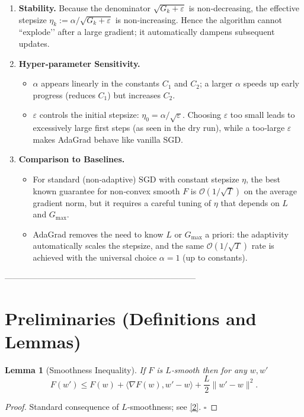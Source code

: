 \documentclass{article}
\newtheorem{lemma}{Lemma}
\begin{document}
\begin{enumerate}[label=\arabic*.]
\item \textbf{Stability.}  Because the denominator $\sqrt{G_k+\varepsilon}$ is non‑decreasing, the effective stepsize $\eta_k:=\alpha/\sqrt{G_k+\varepsilon}$ is non‑increasing.  Hence the algorithm cannot ``explode’’ after a large gradient; it automatically dampens subsequent updates.

\item \textbf{Hyper‑parameter Sensitivity.}
    \begin{itemize}
        \item $\alpha$ appears linearly in the constants $C_1$ and $C_2$; a larger $\alpha$ speeds up early progress (reduces $C_1$) but increases $C_2$.
        \item $\varepsilon$ controls the initial stepsize: $\eta_0=\alpha/\sqrt{\varepsilon}$.  Choosing $\varepsilon$ too small leads to excessively large first steps (as seen in the dry run), while a too‑large $\varepsilon$ makes AdaGrad behave like vanilla SGD.
    \end{itemize}
\item \textbf{Comparison to Baselines.}
    \begin{itemize}
        \item For standard (non‑adaptive) SGD with constant stepsize $\eta$, the best known guarantee for non‑convex smooth $F$ is $\mathcal{O}(1/\sqrt{T})$ on the average gradient norm, but it requires a careful tuning of $\eta$ that depends on $L$ and $G_{\max}$.
        \item AdaGrad removes the need to know $L$ or $G_{\max}$ a priori: the adaptivity automatically scales the stepsize, and the same $\mathcal{O}(1/\sqrt{T})$ rate is achieved with the universal choice $\alpha=1$ (up to constants).
    \end{itemize}
\end{enumerate}

---------------------------------------------------------------------

\section*{Preliminaries (Definitions and Lemmas)}

\begin{lemma}[Smoothness Inequality]\label{lem:smooth}
If $F$ is $L$‑smooth then for any $w,w'$
\[
F(w')\le F(w)+\langle\nabla F(w),w'-w\rangle+\frac{L}{2}\|w'-w\|^2 .
\]
\end{lemma}
\begin{proof}
Standard consequence of $L$‑smoothness; see \eqref{2}. \hfill $\square$
\end{proof}
\end{document}
